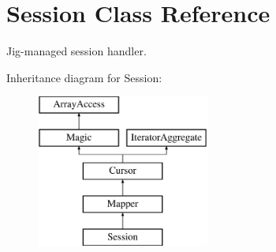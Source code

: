 \hypertarget{class_d_b_1_1_jig_1_1_session}{}\section{Session Class Reference}
\label{class_d_b_1_1_jig_1_1_session}


Jig-\/managed session handler.  


Inheritance diagram for Session\+:\begin{figure}[H]
\begin{center}
\leavevmode
\includegraphics[height=5.000000cm]{class_d_b_1_1_jig_1_1_session}
\end{center}
\end{figure}
